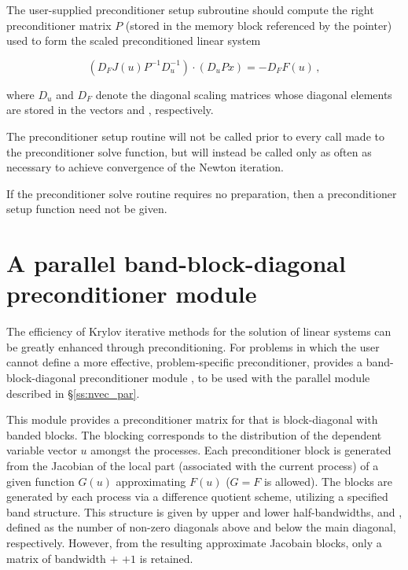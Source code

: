 {
  The user-supplied preconditioner setup subroutine should
  compute the right preconditioner matrix $P$ (stored in the memory
  block referenced by the  pointer) used to form the
  scaled preconditioned linear system
 
   $$(D_F J(u) P^{-1} D_u^{-1}) \cdot (D_u P x) = - D_F F(u) \, ,$$
 
  where $D_u$ and $D_F$ denote the diagonal scaling matrices whose
  diagonal elements are stored in the vectors  and
  , respectively.
 
  The preconditioner setup routine will not be called prior
  to every call made to the preconditioner solve function, but will instead be
  called only as often as necessary to achieve convergence of the
  Newton iteration.
 
  If the preconditioner solve routine requires no preparation, then a
  preconditioner setup function need not be given.
}

\section{A parallel band-block-diagonal preconditioner module}
\label{sss:kinbbdpre}
The efficiency of Krylov iterative methods for the solution of linear systems 
can be greatly enhanced through preconditioning. For problems in which the 
user cannot define a more effective, problem-specific preconditioner,
{\kinsol} provides a band-block-diagonal preconditioner module {\kinbbdpre}, 
to be used with the parallel  module described in \S\ref{ss:nvec_par}.

This module provides a preconditioner matrix for {\kinsol} that
is block-diagonal with banded blocks. The blocking corresponds
to the distribution of the dependent variable vector $u$ amongst
the processes. Each preconditioner block is generated from
the Jacobian of the local part (associated with the current
process) of a given function $G(u)$ approximating $F(u)$
($G = F$ is allowed). The blocks are generated by each process via a
difference quotient scheme, utilizing a specified band structure.
This structure is given by upper and lower half-bandwidths, 
and , defined as the number of non-zero diagonals above and
below the main diagonal, respectively.  However, from the resulting
approximate Jacobain blocks, only a matrix of bandwidth  $+$
 $+ 1$ is retained.

